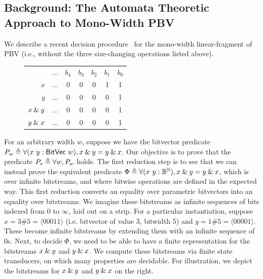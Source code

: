 \subsection{Background: The Automata Theoretic Approach to Mono-Width PBV}

We describe a recent decision procedure~\citep{bhat2025certified} for the
mono-width linear-fragment of PBV (i.e., without the three size-changing
operations listed above).

\begin{figure}
{
\vspace{-2em}
\setlength{\tabcolsep}{4pt}
\begin{tabular}{r|cccccc}
  \rowcolor{black!10!white}
          & $\dots$ & $b_4$ & $b_3$ & $b_2$ & $b_1$ & $b_0$ \\
  $x$           & $\dots$ & 0 & 0 & 0 & 1 & 1 \\
  \rowcolor{black!10!white}
  $y$           & $\dots$ & 0 & 0 & 0 & 0 & 1 \\
  \rowcolor{black!5!white}
  $x \mathbin{\&} y$ & $\dots$ & 0 & 0 & 0 & 0 & 1 \\
  \rowcolor{black!10!white}
  $y \mathbin{\&} x$ & $\dots$ & 0 & 0 & 0 & 0 & 1 \\
\end{tabular}
}
\end{figure}

For an arbitrary width $w$, suppose we have the bitvector predicate $P_w \triangleq
\forall (x~y: \mathsf{BitVec}~{w}), x \mathbin{\&} y = y \mathbin{\&} x$.
Our objective is to prove that the predicate $P_\ast \triangleq \forall w, P_w$ holds.
The first reduction step is to see that we can instead prove the equivalent predicate
$\Phi \triangleq \forall (x~y : \mathsf{\mathbb B^{\mathbb N}}), x \mathbin{\&} y = y \mathbin{\&} x$, which is
over infinite bitstreams, and where bitwise operations are defined in the
expected way.
%
This first reduction converts an equality over parametric bitvectors into an equality over bitstreams.
%
We imagine these bitstreams as infinite sequences of bits indexed from $0$ to $\infty$,
laid out on a strip. For a particular instantiation, suppose $x = 3\#5 = \langle 00011\rangle$
(i.e. bitvector of value $3$, bitwidth $5$) and $y = 1\#5 = \langle 00001\rangle$.
These become infinite bitstreams by extending them with an infinite sequence of $0$s.
%
Next, to decide $\Phi$, we need to be able to have a finite representation for
the bitstreams $x \mathbin{\&} y$ and $y \mathbin{\&} x$.
%
We compute these bitstreams via finite state transducers, on which many
properties are decidable.
%
For illustration, we depict the bitstreams for $x \mathbin{\&} y$ and $y \mathbin{\&} x$
on the right.

